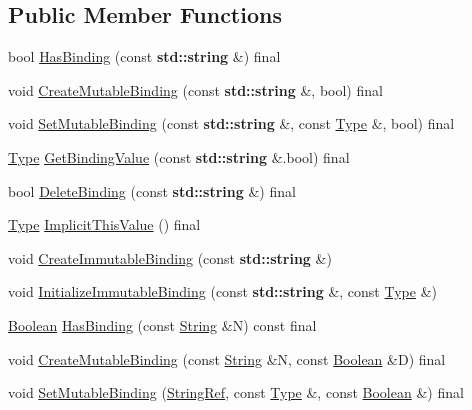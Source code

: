 \subsection*{Public Member Functions}
\begin{DoxyCompactItemize}
\item 
bool \hyperlink{struct_declarative_environment_record_a4588f8af88b79f4317ced4dde8161813}{Has\+Binding} (const \textbf{ std\+::string} \&) final
\item 
void \hyperlink{struct_declarative_environment_record_aa2bc21d70c3869a2065e375dbadd5967}{Create\+Mutable\+Binding} (const \textbf{ std\+::string} \&, bool) final
\item 
void \hyperlink{struct_declarative_environment_record_a9e0b7b5b57e3125b4288a30e2ceac63c}{Set\+Mutable\+Binding} (const \textbf{ std\+::string} \&, const \hyperlink{class_type}{Type} \&, bool) final
\item 
\hyperlink{class_type}{Type} \hyperlink{struct_declarative_environment_record_a53765619db78e907bf5b0da354b2c7fc}{Get\+Binding\+Value} (const \textbf{ std\+::string} \&.bool) final
\item 
bool \hyperlink{struct_declarative_environment_record_ae21d2a351ca2b69110f11ffe13fd2380}{Delete\+Binding} (const \textbf{ std\+::string} \&) final
\item 
\hyperlink{class_type}{Type} \hyperlink{struct_declarative_environment_record_a0e5b27bb35773d4dbf994384265de1c8}{Implicit\+This\+Value} () final
\item 
void \hyperlink{struct_declarative_environment_record_a535362f458fd17e07740cfb066fff385}{Create\+Immutable\+Binding} (const \textbf{ std\+::string} \&)
\item 
void \hyperlink{struct_declarative_environment_record_afe3114f214e519ce7562e43adb5b54ae}{Initialize\+Immutable\+Binding} (const \textbf{ std\+::string} \&, const \hyperlink{class_type}{Type} \&)
\item 
\hyperlink{struct_boolean}{Boolean} \hyperlink{struct_declarative_environment_record_a76b1f7c3be69f63d9711e256b81738d5}{Has\+Binding} (const \hyperlink{struct_string}{String} \&N) const final
\item 
void \hyperlink{struct_declarative_environment_record_af71c0900f0d02f7a74cfd60b0655a9b5}{Create\+Mutable\+Binding} (const \hyperlink{struct_string}{String} \&N, const \hyperlink{struct_boolean}{Boolean} \&D) final
\item 
void \hyperlink{struct_declarative_environment_record_aa1136051a94789af3f2f4b75f0266a04}{Set\+Mutable\+Binding} (\hyperlink{struct_environment_record_ab67bd5dbacae338473147ec3f753a364}{String\+Ref}, const \hyperlink{class_type}{Type} \&, const \hyperlink{struct_boolean}{Boolean} \&) final

\end{DoxyCompactItemize}
